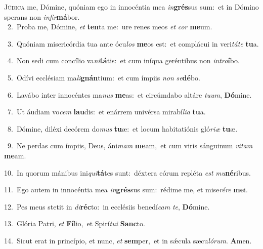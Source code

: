 \lettrine{\initial\textcolor{\initialcolor}{J}}{údica} me, Dómine, quóniam ego in innocéntia mea \textit{in}\-\textbf{grés}sus sum:~\star et in Dómino sperans non \textit{in}\-\textit{fir}\textbf{má}bor.\\
{\numbfont\textcolor{\numbcolor}{~2.}}~Proba me, Dómine, \textit{et} \textbf{ten}\-ta me:~\star ure renes meos \textit{et} \textit{cor} \textbf{me}\-um.\par
{\numbfont\textcolor{\numbcolor}{~3.}}~Quóniam misericórdia tua ante ócu\textit{los} \textbf{me}\-os est:~\star et complácui in veri\-\textit{tá}\-\textit{te} \textbf{tu}\-a.\par
{\numbfont\textcolor{\numbcolor}{~4.}}~Non sedi cum concílio va\-\textit{ni}\-\textbf{tá}tis:~\star et cum iníqua geréntibus non \textit{in}\-\textit{tro}\textbf{í}bo.\par
{\numbfont\textcolor{\numbcolor}{~5.}}~Odívi ecclésiam ma\-\textit{li}\-\textbf{gnán}tium:~\star et cum ímpiis \textit{non} \textit{se}\-\textbf{dé}bo.\par
{\numbfont\textcolor{\numbcolor}{~6.}}~Lavábo inter innocéntes ma\textit{nus} \textbf{me}\-as:~\star et circúmdabo altáre \textit{tu}\-\textit{um}, \textbf{Dó}\-mine.\par
{\numbfont\textcolor{\numbcolor}{~7.}}~Ut áudiam vo\textit{cem} \textbf{lau}\-dis:~\star et enárrem univérsa mirabí\-\textit{li}\-\textit{a} \textbf{tu}\-a.\par
{\numbfont\textcolor{\numbcolor}{~8.}}~Dómine, diléxi decórem do\textit{mus} \textbf{tu}\-æ:~\star et locum habitatiónis gló\-\textit{ri}\-\textit{æ} \textbf{tu}\-æ.\par
{\numbfont\textcolor{\numbcolor}{~9.}}~Ne perdas cum ímpiis, Deus, áni\textit{mam} \textbf{me}\-am,~\star et cum viris sánguinum \textit{vi}\-\textit{tam} \textbf{me}\-am.\par
{\numbfont\textcolor{\numbcolor}{10.}}~In quorum mánibus ini\-\textit{qui}\-\textbf{tá}tes sunt:~\star déxtera eórum repléta \textit{est} \textit{mu}\-\textbf{né}ribus.\par
{\numbfont\textcolor{\numbcolor}{11.}}~Ego autem in innocéntia mea \textit{in}\-\textbf{grés}sus sum:~\star rédime me, et mise\-\textit{ré}\-\textit{re} \textbf{me}\-i.\par
{\numbfont\textcolor{\numbcolor}{12.}}~Pes meus stetit in \textit{di}\-\textbf{réc}to:~\star in ecclésiis benedí\textit{cam} \textit{te}\-, \textbf{Dó}\-mine.\par
{\numbfont\textcolor{\numbcolor}{13.}}~Glória Patri, \textit{et} \textbf{Fí}\-lio,~\star et Spirí\-\textit{tu}\-\textit{i} \textbf{Sanc}\-to.\par
{\numbfont\textcolor{\numbcolor}{14.}}~Sicut erat in princípio, et nunc, \textit{et} \textbf{sem}\-per,~\star et in sǽcula sæcu\-\textit{ló}\-\textit{rum}. \textbf{A}\-men.\par
